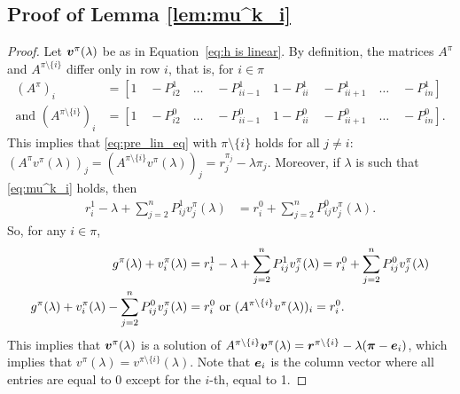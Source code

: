 \documentclass[acmsmall,screen,anonymous]{acmart}
\begin{document}
\subsection{Proof of Lemma \ref{lem:mu^k_i}}\label{app:lem:mu^k_i}

\begin{proof}
    Let $\boldsymbol{v}^{\pi}(\lambda)$ be as in Equation~\eqref{eq:h is linear}. By definition, the matrices $A^{\pi}$ and $A^{\pi\setminus\{i\}}$ differ only in  row $i$, that is, for $i\in\pi$
    \begin{align*}
        (A^\pi)_i &=[1\quad -P^1_{i2}\quad \dots\quad -P^1_{ii-1}\quad 1-P^1_{ii}\quad -P^1_{ii+1}\quad \dots\quad -P^1_{in}] \\
        \text{and } (A^{\pi\setminus\{i\}})_i &=[1\quad -P^0_{i2}\quad \dots\quad -P^0_{ii-1}\quad 1-P^0_{ii}\quad -P^0_{ii+1}\quad \dots\quad -P^0_{in}].
    \end{align*}
    This implies that \eqref{eq:pre_lin_eq} with $\pi{\setminus}\{i\}$ holds for all $j\ne i$: $(A^{\pi}v^{\pi}(\lambda))_j = (A^{\pi{\setminus}\{i\}}v^{\pi}(\lambda))_j= r_j^{\pi_j}-\lambda\pi_j$. Moreover, if $\lambda$ is such that \eqref{eq:mu^k_i} holds, then
    \begin{align*}
        r^1_i - \lambda + \sum_{j=2}^n P^{1}_{ij} v^\pi_j(\lambda) &= r^0_i + \sum_{j=2}^n P^{0}_{ij} v^\pi_j(\lambda).
    \end{align*}
    So, for any $i\in\pi$,
    \begin{align*}
        g^{\pi}(\lambda) + v_i^{\pi}(\lambda) &=r^1_i -\lambda +\sum_{j=2}^n P^{1}_{ij} v^\pi_j(\lambda) =r^0_i + \sum_{j=2}^n P^{0}_{ij} v^\pi_j(\lambda) \\
        g^{\pi}(\lambda) + v_i^{\pi}(\lambda) -\sum_{j=2}^n P^{0}_{ij} v^\pi_j(\lambda) &=r^0_i \text{ or } (A^{\pi\setminus\{i\}}v^{\pi}(\lambda))_i = r^0_i.
    \end{align*}
    This implies that $\boldsymbol{v}^\pi(\lambda)$ is a solution of $A^{\pi\setminus\{i\}} \boldsymbol{v}^\pi(\lambda)= \boldsymbol{r}^{\pi\setminus\{i\}} - \lambda (\boldsymbol{\pi}-\boldsymbol{e}_i)$, which implies that $v^\pi(\lambda)=v^{\pi\setminus\{i\}}(\lambda)$. Note that $\boldsymbol{e}_i$ is the column vector where all entries are equal to $0$ except for the $i$-th, equal to 1.
\end{proof}
\end{document}
